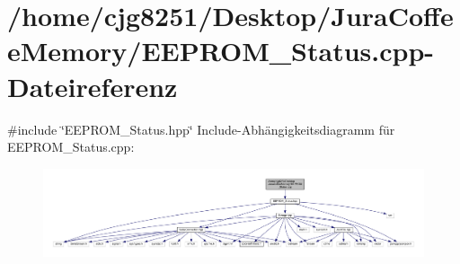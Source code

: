 \section{/home/cjg8251/\+Desktop/\+Jura\+Coffee\+Memory/\+E\+E\+P\+R\+O\+M\+\_\+\+Status.cpp-\/\+Dateireferenz}
\label{_e_e_p_r_o_m___status_8cpp}
{\ttfamily \#include \char`\"{}E\+E\+P\+R\+O\+M\+\_\+\+Status.\+hpp\char`\"{}}\newline
Include-\/\+Abhängigkeitsdiagramm für E\+E\+P\+R\+O\+M\+\_\+\+Status.\+cpp\+:
\nopagebreak
\begin{figure}[H]
\begin{center}
\leavevmode
\includegraphics[width=350pt]{_e_e_p_r_o_m___status_8cpp__incl}
\end{center}
\end{figure}
